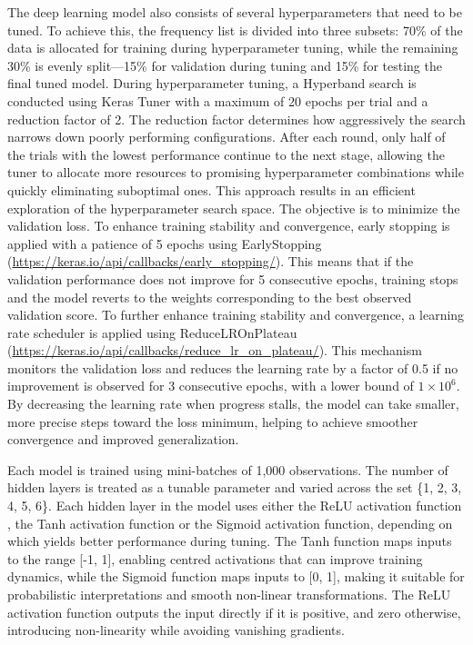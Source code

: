 \documentclass[a4paper,11pt]{report}
\begin{document}
The deep learning model also consists of several hyperparameters that need to be tuned. To achieve this, the frequency list is divided into three subsets: 70\% of the data is allocated for training during hyperparameter tuning, while the remaining 30\% is evenly split—15\% for validation during tuning and 15\% for testing the final tuned model. During hyperparameter tuning, a Hyperband search is conducted using Keras Tuner with a maximum of 20 epochs per trial and a reduction factor of 2. The reduction factor determines how aggressively the search narrows down poorly performing configurations. After each round, only half of the trials with the lowest performance continue to the next stage, allowing the tuner to allocate more resources to promising hyperparameter combinations while quickly eliminating suboptimal ones. This approach results in an efficient exploration of the hyperparameter search space. The objective is to minimize the validation loss. To enhance training stability and convergence, early stopping is applied with a patience of 5 epochs using EarlyStopping (\url{https://keras.io/api/callbacks/early_stopping/}). This means that if the validation performance does not improve for 5 consecutive epochs, training stops and the model reverts to the weights corresponding to the best observed validation score. To further enhance training stability and convergence, a learning rate scheduler is applied using ReduceLROnPlateau (\url{https://keras.io/api/callbacks/reduce_lr_on_plateau/}). This mechanism monitors the validation loss and reduces the learning rate by a factor of 0.5 if no improvement is observed for 3 consecutive epochs, with a lower bound of $1 \times 10^6$. By decreasing the learning rate when progress stalls, the model can take smaller, more precise steps toward the loss minimum, helping to achieve smoother convergence and improved generalization.

Each model is trained using mini-batches of 1,000 observations. The number of hidden layers is treated as a tunable parameter and varied across the set \{1, 2, 3, 4, 5, 6\}. Each hidden layer in the model uses either the ReLU activation function \cite{relu}, the Tanh activation function \cite{tanh} or the Sigmoid activation function\cite{sigmoid}, depending on which yields better performance during tuning. The Tanh function maps inputs to the range [-1, 1], enabling centred activations that can improve training dynamics, while the Sigmoid function maps inputs to [0, 1], making it suitable for probabilistic interpretations and smooth non-linear transformations. The ReLU activation function outputs the input directly if it is positive, and zero otherwise, introducing non-linearity while avoiding vanishing gradients.
\end{document}
